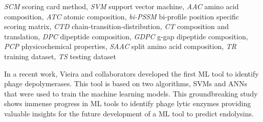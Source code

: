 \documentclass[runningheads]{llncs}
\begin{document}
\begin{table}
\caption{ML models and respective methods and features. \cite{Nami2021}.}\label{tab1}
\textit{SCM} scoring card method, \textit{SVM} support vector machine, \textit{AAC} amino acid composition, \textit{ATC} atomic composition, \textit{bi-PSSM} bi-profile position specific scoring matrix,
\textit{CTD} chain-transition-distribution, \textit{CT} composition and translation, \textit{DPC} dipeptide composition, \textit{GDPC} g-gap dipeptide composition, \textit{PCP} physicochemical properties,
\textit{SAAC} split amino acid composition, \textit{TR} training dataset, \textit{TS} testing dataset
\end{table}

In a recent work, Vieira and collaborators \cite{Vieira2023} developed the first ML tool to identify phage depolymerases. This tool is based on two algorithms, SVMs and ANNs that were used to train the machine learning models. This groundbreaking study shows immense progress in ML tools to identify phage lytic enzymes providing valuable insights for the future development of a ML tool to predict endolysins.
%

%

%
\end{document}
